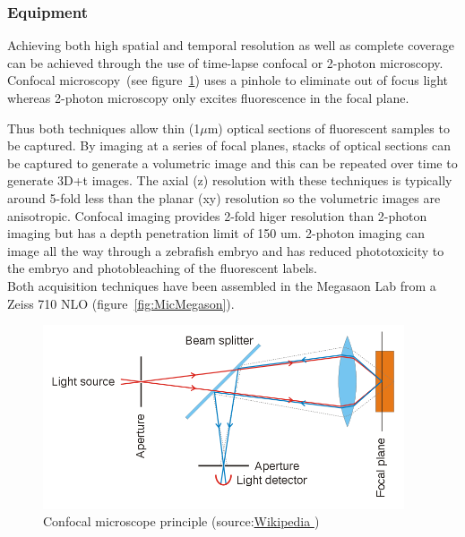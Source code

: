\subsubsection{Equipment}

Achieving both high spatial and temporal resolution as well as complete coverage
can be achieved through the use of time-lapse confocal or 2-photon microscopy.
Confocal microscopy~(see figure~\ref{fig:ConfocalPrinciple}) uses a pinhole to
eliminate out of focus light whereas 2-photon microscopy only excites
fluorescence in the focal plane.

Thus both techniques allow thin (1$\mu$m) optical sections of fluorescent
samples to be captured. By imaging at a series of focal planes, stacks of
optical sections can be captured to generate a volumetric image and this can be
repeated over time to generate 3D+t images. The axial (z) resolution with these
techniques is typically around 5-fold less than the planar (xy) resolution so
the volumetric images are anisotropic. Confocal imaging provides 2-fold higer
resolution than 2-photon imaging but has a depth penetration limit of  150 um.
2-photon imaging can image all the way through a zebrafish embryo and has
reduced phototoxicity to the embryo and photobleaching of the fluorescent
labels.\\

Both acquisition techniques have been assembled in the Megasaon Lab from a
Zeiss 710 NLO (figure~\ref{fig:MicMegason}).


\begin{figure}[htb]
\begin{center}
\leavevmode
 \includegraphics[width=0.95\textwidth]{pictures/ConfocalPrinciple}
\end{center}
\caption{Confocal microscope principle
(source:\href{http://en.wikipedia.org/wiki/File:Confocalprinciple.svg}{Wikipedia
})}
\label{fig:ConfocalPrinciple}
\end{figure}


